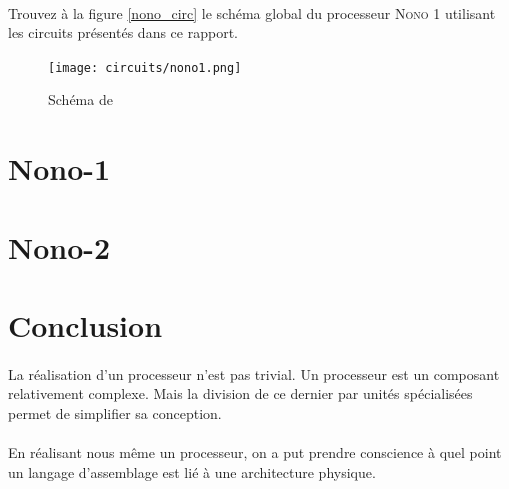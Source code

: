 \documentclass[a4paper]{article}
\begin{document}
		\paragraph{}{
				Trouvez à la figure \ref{nono_circ} le schéma global du processeur \textsc{Nono 1}
				utilisant les circuits présentés dans ce rapport.
		}
		
		\begin{figure}
			\texttt{[image: circuits/nono1.png]}
			\caption{
			\label{non_circ}
			Schéma de 
			}
		\end{figure}
					
	
		\section{Nono-1}
			
		\section{Nono-2}
			
	

	
	
	\newpage
	\section*{Conclusion}
		\paragraph{}{
		La réalisation d'un processeur n'est pas trivial. Un processeur est un 
		composant relativement complexe. Mais la division de ce dernier par unités
		spécialisées permet de simplifier sa conception. \newline
		}
		
		\paragraph{}{
		En réalisant nous même un processeur, on a put prendre conscience à 
		quel point un langage d'assemblage est lié à une architecture physique.
		}
		
	\newpage
	\listoffigures
		
\end{document}
